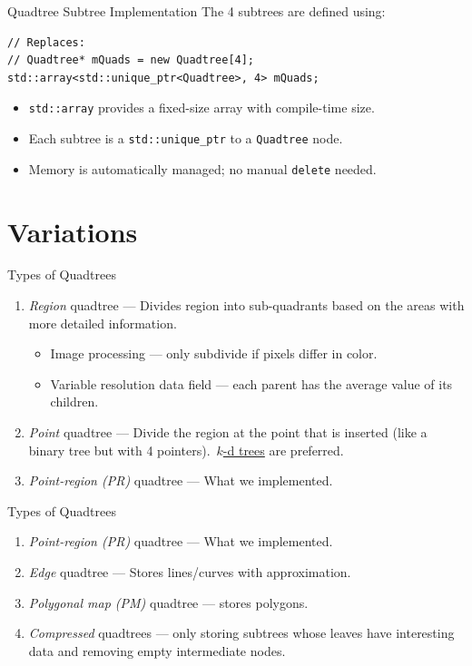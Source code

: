 \documentclass[14pt,aspectratio=1610]{beamer}
\begin{document}
\begin{frame}[fragile]{Quadtree Subtree Implementation}
  The 4 subtrees are defined using:

\begin{lstlisting}
// Replaces:
// Quadtree* mQuads = new Quadtree[4];
std::array<std::unique_ptr<Quadtree>, 4> mQuads;
\end{lstlisting}

\begin{itemize}
  \item \lstinline{std::array} provides a fixed-size array with compile-time size.
  \item Each subtree is a \lstinline{std::unique_ptr} to a \lstinline{Quadtree} node.
  \item Memory is automatically managed; no manual \lstinline{delete} needed.
\end{itemize}
\end{frame}

\section{Variations}

\begin{frame}{Types of Quadtrees}
  \pause{}
  \begin{enumerate}
    \setlength\itemsep{0.5em}
    \item<+->
      \emph{Region} quadtree --- Divides region into sub-quadrants based on the areas with more detailed information.
      \begin{itemize}
        \item Image processing --- only subdivide if pixels differ in color.
        \item Variable resolution data field --- each parent has the average value of its children.
      \end{itemize}
    \item<+->
      \emph{Point} quadtree --- Divide the region at the point that is inserted (like a binary tree but with 4 pointers).\ \href{https://en.wikipedia.org/wiki/K-d_tree}{$k$-d trees} are preferred.
    \item<+->
      \emph{Point-region (PR)} quadtree --- What we implemented.
  \end{enumerate}
\end{frame}

\begin{frame}{Types of Quadtrees}
  \pause{}
  \begin{enumerate}[<+->]
    \setlength\itemsep{0.5em}
    \setcounter{enumi}{3} %
    \item
      \emph{Point-region (PR)} quadtree --- What we implemented.
    \item
      \emph{Edge} quadtree --- Stores lines/curves with approximation.
    \item
      \emph{Polygonal map (PM)} quadtree --- stores polygons.
    \item
      \emph{Compressed} quadtrees --- only storing subtrees whose leaves have interesting data and removing empty intermediate nodes.
  \end{enumerate}
\end{frame}
\end{document}
